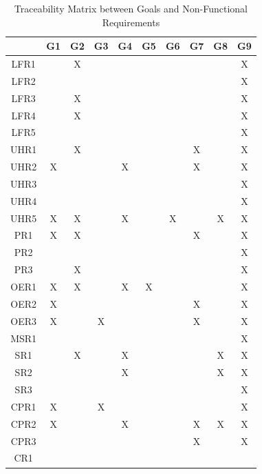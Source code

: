 \documentclass[12pt]{article}
\begin{document}
    \begin{table}[h!]
        \centering
        \begin{tabular}{|c|c|c|c|c|c|c|c|c|c|}
            \hline
            &    G1&G2&G3&G4&G5&G6&G7&G8&G9 \\ \hline
            LFR1&  & X&  &  &  &  &  &  & X\\ \hline
            LFR2&  &  &  &  &  &  &  &  & X\\ \hline
            LFR3&  & X&  &  &  &  &  &  & X\\ \hline
            LFR4&  & X&  &  &  &  &  &  & X\\ \hline
            LFR5&  &  &  &  &  &  &  &  & X\\ \hline
            UHR1&  & X&  &  &  &  & X&  & X\\ \hline
            UHR2& X&  &  & X&  &  & X&  & X\\ \hline
            UHR3&  &  &  &  &  &  &  &  & X\\ \hline
            UHR4&  &  &  &  &  &  &  &  & X\\ \hline
            UHR5& X& X&  & X&  & X&  & X& X\\ \hline
            PR1 & X& X&  &  &  &  & X&  & X\\ \hline
            PR2 &  &  &  &  &  &  &  &  & X\\ \hline
            PR3 &  & X&  &  &  &  &  &  & X\\ \hline
            OER1& X& X&  & X& X&  &  &  & X\\ \hline
            OER2& X&  &  &  &  &  & X&  & X\\ \hline
            OER3& X&  & X&  &  &  & X&  & X\\ \hline
            MSR1&  &  &  &  &  &  &  &  & X\\ \hline
            SR1 &  & X&  & X&  &  &  & X& X\\ \hline
            SR2 &  &  &  & X&  &  &  & X& X\\ \hline
            SR3 &  &  &  &  &  &  &  &  & X\\ \hline
            CPR1& X&  & X&  &  &  &  &  & X\\ \hline
            CPR2& X&  &  & X&  &  & X& X& X\\ \hline
            CPR3&  &  &  &  &  &  & X&  & X\\ \hline
            CR1 &  &  &  &  &  &  &  &  &  \\ \hline
        \end{tabular}
        \caption{Traceability Matrix between Goals and Non-Functional Requirements}
    \end{table}
\end{document}
